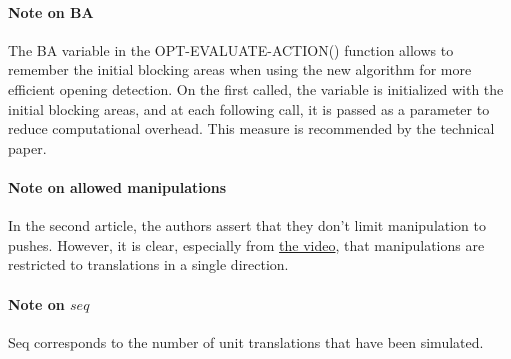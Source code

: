 \paragraph{Note on BA}\label{remember_ba_note} The BA variable in the OPT-EVALUATE-ACTION() function allows to remember the initial blocking areas when using the new algorithm for more efficient opening detection. On the first called, the variable is initialized with the initial blocking areas, and at each following call, it is passed as a parameter to reduce computational overhead. This measure is recommended by the technical paper.

\paragraph{Note on allowed manipulations}\label{allowed_manipulations_note} In the second article, the authors assert that they don't limit manipulation to pushes. However, it is clear, especially from \href{https://youtu.be/3AvfPVzBb-s}{the video}, that manipulations are restricted to translations in a single direction.

\paragraph{Note on $seq$}\label{seq_note} Seq corresponds to the number of unit translations that have been simulated.






